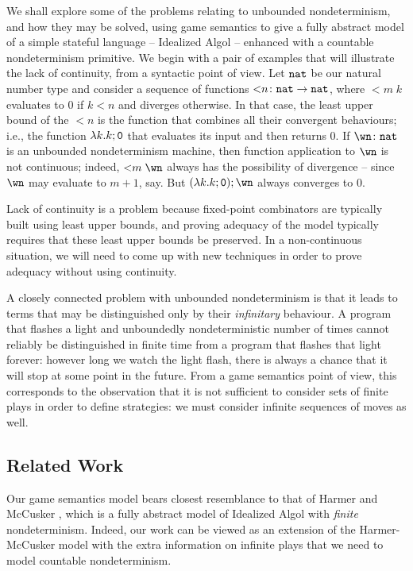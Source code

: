 \documentclass[sigplan,9pt,review]{acmart}\settopmatter{printfolios=true,printccs=false,printacmref=false}
\begin{document}
We shall explore some of the problems relating to unbounded nondeterminism, and how they may be solved, using game semantics to give a fully abstract model of a simple stateful language -- Idealized Algol -- enhanced with a countable nondeterminism primitive.  
We begin with a pair of examples that will illustrate the lack of continuity, from a syntactic point of view.  
Let ${\mathtt{nat}}$ be our natural number type and consider a sequence of functions ${<}n\colon{\mathtt{nat}}\to{\mathtt{nat}}$, where ${<}m\;k$ evaluates to $0$ if $k<n$ and diverges otherwise.
In that case, the least upper bound of the ${<}n$ is the function that combines all their convergent behaviours; i.e., the function $\lambda k.k;{\mathtt{0}}$ that evaluates its input and then returns $0$.
If $\wn\from\nat$ is an unbounded nondeterminism machine, then function application to $\wn$ is not continuous; indeed, ${<}m\;\wn$ always has the possibility of divergence -- since $\wn$ may evaluate to $m+1$, say.  
But $(\lambda k.k;\0);\wn$ always converges to $0$.

Lack of continuity is a problem because fixed-point combinators are typically built using least upper bounds, and proving adequacy of the model typically requires that these least upper bounds be preserved.  
In a non-continuous situation, we will need to come up with new techniques in order to prove adequacy without using continuity.

A closely connected problem with unbounded nondeterminism is that it leads to terms that may be distinguished only by their \emph{infinitary} behaviour.  
A program that flashes a light and unboundedly nondeterministic number of times cannot reliably be distinguished in finite time from a program that flashes that light forever: however long we watch the light flash, there is always a chance that it will stop at some point in the future.  
From a game semantics point of view, this corresponds to the observation that it is not sufficient to consider sets of finite plays in order to define strategies: we must consider infinite sequences of moves as well.  

\subsection{Related Work}

Our game semantics model bears closest resemblance to that of Harmer and McCusker \cite{mcCHFiniteND}, which is a fully abstract model of Idealized Algol with \emph{finite} nondeterminism.  
Indeed, our work can be viewed as an extension of the Harmer-McCusker model with the extra information on infinite plays that we need to model countable nondeterminism.  
\end{document}
